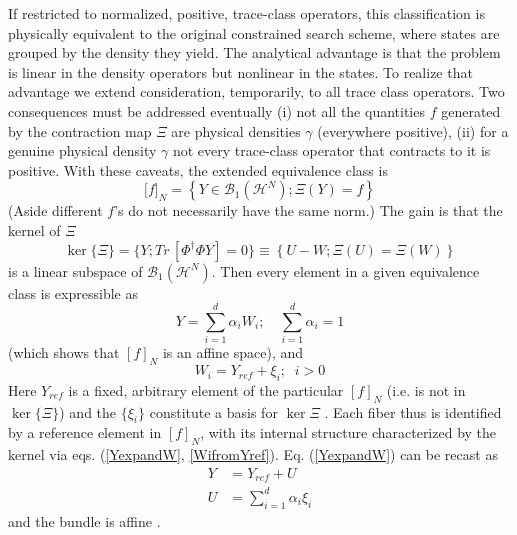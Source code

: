 \documentclass[aps,preprint]{revtex4}%
\begin{document}
If restricted to normalized, positive, trace-class operators, this
classification is physically equivalent to the original constrained search
scheme, where states are grouped by the density they yield. The analytical
advantage is that the problem is linear in the density operators but nonlinear
in the states. To realize that advantage we extend consideration, temporarily,
to all trace class operators. Two consequences must be addressed eventually
(i) not all the quantities $f$ generated by the contraction map $\Xi$ are
physical densities $\gamma$ (everywhere positive), (ii) for a genuine physical
density $\gamma$ not every trace-class operator that contracts to it is
positive. With these caveats, the extended equivalence class is
\begin{equation}
\lbrack f]_{N}=\left\{  Y\in\mathcal{B}_{1}(\mathcal{H}^{N});\Xi(Y)=f\right\}
\label{genequiv}%
\end{equation}
(Aside different $f$'s do not necessarily have the same norm.) The gain is
that the kernel of $\Xi$
\begin{equation}
\ker\{\Xi\}=\{Y;Tr\,[\Phi^{\dagger}\Phi Y]=0\}\equiv\left\{  U-W;\Xi\left(
U\right)  =\Xi\left(  W\right)  \right\}  \label{kerdef}%
\end{equation}
is a linear subspace of $\mathcal{B}_{1}(\mathcal{H}^{N})$. Then every element
in a given equivalence class is expressible as
\begin{equation}
Y=\sum_{i=1}^{d}\alpha_{i}W_{i};\quad\sum_{i=1}^{d}\alpha_{i}=1
\label{YexpandW}%
\end{equation}
(which shows that $[f]_{N}$ is an affine space), and
\begin{equation}
W_{i}=Y_{ref}+\xi_{i};\;\;i>0 \label{WifromYref}%
\end{equation}
Here $Y_{ref}$ is a fixed, arbitrary element of the particular $[f]_{N}$ (i.e.
is not in $\ker\{\Xi\}$) and the $\{\xi_{i}\}$ constitute a basis for $\ker
\Xi$ \cite{Yref}. Each fiber thus is identified by a reference element in
$[f]_{N}$, with its internal structure characterized by the kernel via eqs.
(\ref{YexpandW}, \ref{WifromYref}). Eq. (\ref{YexpandW}) can be recast as
\begin{align}
Y  &  =Y_{ref}+U\nonumber\\
U  &  =\sum_{i=1}^{d}\alpha_{i}\xi_{i} \label{YYref}%
\end{align}
and the bundle is affine \cite{diffbundle}.
\end{document}

